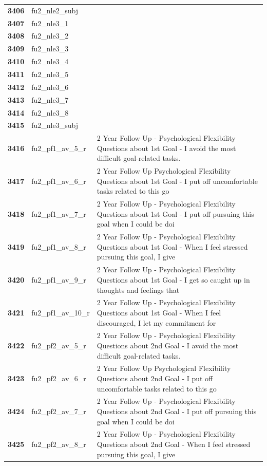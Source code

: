 \documentclass[
  letterpaper,
  DIV=11,
  numbers=noendperiod]{scrartcl}
\begin{document}
\begin{longtable}[t]{>{}cll}
\addlinespace
\textbf{3406} & fu2\_nle2\_subj & \\
\textbf{3407} & fu2\_nle3\_1 & \\
\textbf{3408} & fu2\_nle3\_2 & \\
\textbf{3409} & fu2\_nle3\_3 & \\
\textbf{3410} & fu2\_nle3\_4 & \\
\addlinespace
\textbf{3411} & fu2\_nle3\_5 & \\
\textbf{3412} & fu2\_nle3\_6 & \\
\textbf{3413} & fu2\_nle3\_7 & \\
\textbf{3414} & fu2\_nle3\_8 & \\
\textbf{3415} & fu2\_nle3\_subj & \\
\addlinespace
\textbf{3416} & fu2\_pf1\_av\_5\_r & 2 Year Follow Up - Psychological Flexibility Questions about 1st Goal - I avoid the most difficult goal-related tasks.\\
\textbf{3417} & fu2\_pf1\_av\_6\_r & 2 Year Follow Up Psychological Flexibility Questions about 1st Goal - I put off uncomfortable tasks related to this go\\
\textbf{3418} & fu2\_pf1\_av\_7\_r & 2 Year Follow Up - Psychological Flexibility Questions about 1st Goal - I put off pursuing this goal when I could be doi\\
\textbf{3419} & fu2\_pf1\_av\_8\_r & 2 Year Follow Up - Psychological Flexibility Questions about 1st Goal - When I feel stressed pursuing this goal, I give\\
\textbf{3420} & fu2\_pf1\_av\_9\_r & 2 Year Follow Up - Psychological Flexibility Questions about 1st Goal - I get so caught up in thoughts and feelings that\\
\addlinespace
\textbf{3421} & fu2\_pf1\_av\_10\_r & 2 Year Follow Up - Psychological Flexibility Questions about 1st Goal - When I feel discouraged, I let my commitment for\\
\textbf{3422} & fu2\_pf2\_av\_5\_r & 2 Year Follow Up - Psychological Flexibility Questions about 2nd Goal - I avoid the most difficult goal-related tasks.\\
\textbf{3423} & fu2\_pf2\_av\_6\_r & 2 Year Follow Up Psychological Flexibility Questions about 2nd Goal - I put off uncomfortable tasks related to this go\\
\textbf{3424} & fu2\_pf2\_av\_7\_r & 2 Year Follow Up - Psychological Flexibility Questions about 2nd Goal - I put off pursuing this goal when I could be doi\\
\textbf{3425} & fu2\_pf2\_av\_8\_r & 2 Year Follow Up - Psychological Flexibility Questions about 2nd Goal - When I feel stressed pursuing this goal, I give\\

\end{longtable}
\end{document}
